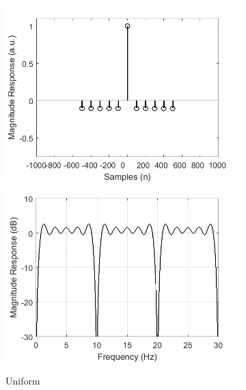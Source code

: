 \documentclass[a4paper]{article}
\begin{document}
\begin{figure}[hbtp]
    \begin{subfigure}{.245\textwidth}
        \includegraphics[width=\textwidth]{img/sym/kernel_ave.png}\\
        \includegraphics[width=\textwidth]{img/sym/mag_ave.png}
        \caption{Uniform}\label{fig:UniformSymKernel}
    \end{subfigure}
    \begin{subfigure}{.245\textwidth}

\end{subfigure}
\end{figure}
\end{document}
